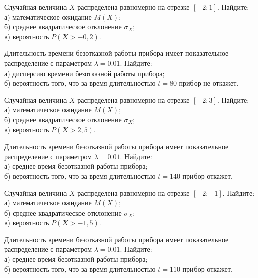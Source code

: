 \vfill

\newpage\setcounter{zad}{0}

\z Случайная величина $X$ распределена равномерно на отрезке $[-2; 1]$. Найдите: \\ \quad а) математическое ожидание $M(X)$; \\ \quad б) среднее квадратическое отклонение $\sigma_X$; \\ \quad в) вероятность $P(X>-0{,}2)$.


\vfill

\z Длительность времени безотказной работы прибора имеет показательное распределение с параметром $\lambda = 0.01$. Найдите: \\ \quad а) дисперсию времени безотказной работы прибора; \\ \quad б) вероятность того, что за время длительностью $t = 80$ прибор не откажет.
 

\vfill

\newpage\setcounter{zad}{0}

\z Случайная величина $X$ распределена равномерно на отрезке $[-2; 3]$. Найдите: \\ \quad а) математическое ожидание $M(X)$; \\ \quad б) среднее квадратическое отклонение $\sigma_X$; \\ \quad в) вероятность $P(X>2{,}5)$.


\vfill

\z Длительность времени безотказной работы прибора имеет показательное распределение с параметром $\lambda = 0.01$. Найдите: \\ \quad а) среднее время безотказной работы прибора; \\ \quad б) вероятность того, что за время длительностью $t = 140$ прибор откажет.
 

\vfill

\newpage\setcounter{zad}{0}

\z Случайная величина $X$ распределена равномерно на отрезке $[-2; -1]$. Найдите: \\ \quad а) математическое ожидание $M(X)$; \\ \quad б) среднее квадратическое отклонение $\sigma_X$; \\ \quad в) вероятность $P(X>-1{,}5)$.


\vfill

\z Длительность времени безотказной работы прибора имеет показательное распределение с параметром $\lambda = 0.01$. Найдите: \\ \quad а) среднее время безотказной работы прибора; \\ \quad б) вероятность того, что за время длительностью $t = 110$ прибор откажет.
 

